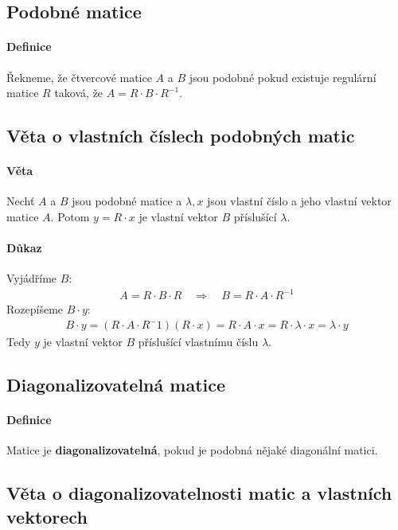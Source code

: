 \documentclass[a4paper,10pt]{article}
\begin{document}
\subsection{Podobné matice}
\setcounter{equation}{0}
\paragraph{Definice}
Řekneme, že čtvercové matice $A$ a $B$ jsou podobné pokud existuje regulární matice
$R$ taková, že $A = R \cdot B \cdot R^{-1}$.

\subsection{Věta o vlastních číslech podobných matic}
\setcounter{equation}{0}
\paragraph{Věta}
Nechť $A$ a $B$ jsou podobné matice a $\lambda, x$ jsou vlastní číslo a jeho vlastní
vektor matice $A$. Potom $y = R \cdot x$ je vlastní vektor $B$ příslušící $\lambda$.
\paragraph{Důkaz}
Vyjádříme $B$:
\begin{align}
	A = R \cdot B \cdot R \quad \Rightarrow \quad B = R \cdot A \cdot R^{-1}
\end{align}
Rozepíšeme $B \cdot y$:
\begin{align}
	B \cdot y = (R \cdot A \cdot R^-1)(R \cdot x) = R\cdot A \cdot x = R \cdot
	\lambda \cdot x = \lambda \cdot y
\end{align}
Tedy $y$ je vlastní vektor $B$ příslušící vlastnímu číslu $\lambda$.

\subsection{Diagonalizovatelná matice}
\setcounter{equation}{0}
\paragraph{Definice}
Matice je \textbf{diagonalizovatelná}, pokud je podobná nějaké diagonální matici.

\subsection{Věta o diagonalizovatelnosti matic a vlastních vektorech}
\setcounter{equation}{0}
\end{document}
